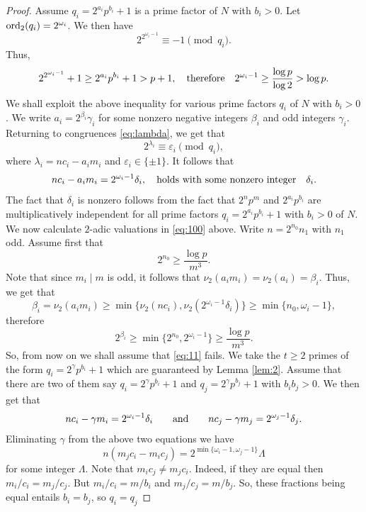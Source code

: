 \documentclass[10pt,a4paper]{amsart}
\begin{document}
\begin{proof}
Assume $q_i=2^{a_i}p^{b_i}+1$ is a prime factor of $N$ with $b_i>0$. Let ${\text{\rm ord}}_2(q_i)=2^{\omega_i}$. We then have 
$$
2^{2^{\omega_i-1}}\equiv -1\pmod {q_i}.
$$
Thus, 
\begin{equation}
\label{e:10}
2^{2^{\omega_i-1}}+1\ge 2^{a_i}p^{b_i}+1>p+1,\quad {\text{\rm therefore}}\quad 2^{\omega_i-1}\ge \frac{\log p}{\log 2}>\log p.
\end{equation}
We shall exploit the above inequality for various prime factors $q_i$ of $N$ with $b_i>0$. We write $a_i=2^{\beta_i}\gamma_i$ for some  nonzero negative integers $\beta_i$ and odd integers $\gamma_i$. 
Returning to congruences \eqref{eq:lambda}, we get that 
$$
2^{\lambda_i}\equiv \varepsilon_i\pmod {q_i},
$$
where $\lambda_i=nc_i-a_im_i$ and $\varepsilon_i\in \{\pm 1\}$. It follows that 
\begin{equation}
\label{eq:100}
nc_i-a_im_i=2^{\omega_i-1}\delta_i,\quad {\text{\rm holds~with~some~nonzero~integer}}\quad \delta_i.
\end{equation}
The fact that $\delta_i$ is nonzero follows from the fact that $2^np^m$ and $2^{a_i}p^{b_i}$ are multiplicatively independent for all prime factors $q_i=2^{a_i}p^{b_i}+1$ with $b_i>0$ of $N$. 
We now calculate $2$-adic valuations in \eqref{eq:100} above. Write $n=2^{n_0}n_1$ with $n_1$ odd. Assume first that 
\begin{equation}
\label{eq:11}
2^{n_0}\ge\frac{\log p}{m^3}. 
\end{equation}
Note that since $m_i\mid m$ is odd, it follows that $\nu_2(a_im_i)=\nu_2(a_i)=\beta_i$. Thus, 
we get that 
$$
\beta_i=\nu_2(a_im_i)\ge \min\{\nu_2(nc_i),\nu_2(2^{\omega_i-1}\delta_i)\}\ge \min\{n_0,\omega_i-1\},
$$
therefore 
$$
2^{\beta_i}\ge \min\{2^{n_0},2^{\omega_i-1}\}\ge \frac{\log p}{m^3}.
$$
So, from now on we shall assume that \eqref{eq:11} fails. We take the $t\ge 2$ primes of the form $q_i=2^{\gamma}p^{b_i}+1$ which are guaranteed by Lemma \ref{lem:2}. Assume that there are two of them say $q_i=2^{\gamma}p^{b_i}+1$ and $q_j=2^{\gamma}p^{b_j}+1$ with $b_ib_j> 0$. We then get that 
$$
nc_i-\gamma m_i=2^{\omega_i-1}\delta_i\qquad {\text{\rm and}}\qquad nc_j-\gamma m_j=2^{\omega_j-1}\delta_j.
$$
Eliminating $\gamma$ from the above two equations we have 
$$
n(m_jc_i-m_ic_j)=2^{\min\{\omega_i-1,\omega_j-1\}}\Lambda
$$
for some integer $\Lambda$. Note that $m_ic_j\ne m_jc_i$. Indeed, if they are equal then $m_i/c_i=m_j/c_j$. But $m_i/c_i=m/b_i$ and $m_j/c_j=m/b_j$. So, these fractions being equal entails $b_i=b_j$, so $q_i=q_j$ 

\end{proof}
\end{document}
